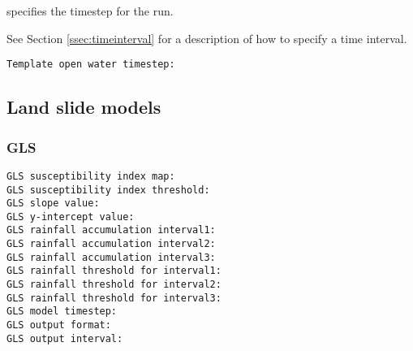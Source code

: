  
  specifies the timestep for the run.

 See Section \ref{ssec:timeinterval} for a description
 of how to specify a time interval.
 

 \begin{Verbatim}[frame=single]
Template open water timestep:
 \end{Verbatim}
 

 
 
 \subsection{Land slide models} \label{ssec:landslides}
 

 
 \subsubsection{GLS} \label{sssec:gls}
  

  

  

  

  

  

  

  

  

  

  

  

  
 

 \begin{Verbatim}[frame=single]
GLS susceptibility index map:
GLS susceptibility index threshold:
GLS slope value:
GLS y-intercept value:
GLS rainfall accumulation interval1:
GLS rainfall accumulation interval2:
GLS rainfall accumulation interval3:
GLS rainfall threshold for interval1:
GLS rainfall threshold for interval2:
GLS rainfall threshold for interval3:
GLS model timestep:
GLS output format:
GLS output interval:
 \end{Verbatim}


